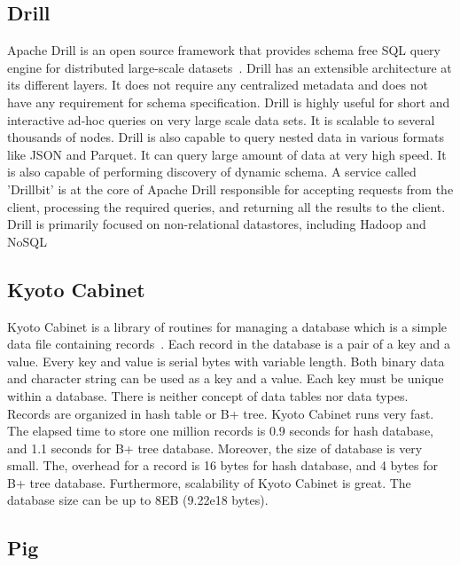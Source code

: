 \subsection{Drill}

Apache Drill is an open source framework that provides schema free SQL
query engine for distributed large-scale
datasets~\cite{www-ApacheDrill}. Drill has an extensible architecture
at its different layers. It does not require any centralized metadata
and does not have any requirement for schema specification. Drill is
highly useful for short and interactive ad-hoc queries on very large
scale data sets. It is scalable to several thousands of nodes. Drill
is also capable to query nested data in various formats like JSON and
Parquet. It can query large amount of data at very high speed. It is
also capable of performing discovery of dynamic schema.  A service
called 'Drillbit' is at the core of Apache Drill responsible for
accepting requests from the client, processing the required queries,
and returning all the results to the client.  Drill is primarily
focused on non-relational datastores, including Hadoop and NoSQL

     \pv

\subsection{Kyoto Cabinet}

Kyoto Cabinet is a library of routines for managing a database which
is a simple data file containing records~\cite{www-KyotoCabinet}.
Each record in the database is a pair of a key and a value. Every key
and value is serial bytes with variable length. Both binary data and
character string can be used as a key and a value. Each key must be
unique within a database.  There is neither concept of data tables nor
data types. Records are organized in hash table or B+ tree. Kyoto
Cabinet runs very fast. The elapsed time to store one million records
is 0.9 seconds for hash database, and 1.1 seconds for B+ tree
database. Moreover, the size of database is very small. The, overhead
for a record is 16 bytes for hash database, and 4 bytes for B+ tree
database. Furthermore, scalability of Kyoto Cabinet is great. The
database size can be up to 8EB (9.22e18 bytes).


     \pv

\subsection{Pig}

